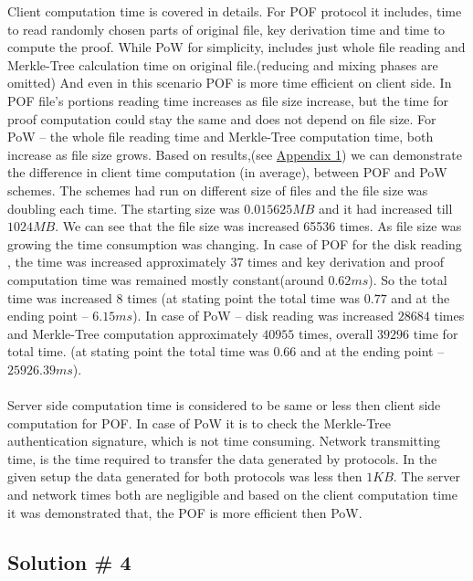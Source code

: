 \documentclass[12pt]{article}
\begin{document}
Client computation time is covered in details. For POF protocol it includes, time to read randomly chosen parts of original file, key derivation time and time to compute the proof. While PoW for simplicity, includes just whole file reading and Merkle-Tree calculation time on original file.(reducing and mixing phases are omitted) And even in this scenario POF is more time efficient on client side. In POF file's portions reading time increases as file size increase, but the time for proof computation could stay the same and does not depend on file size. For PoW -- the whole file reading time and Merkle-Tree computation time, both increase as file size grows. Based on results,(see \hyperref[Appendix 1] {Appendix 1})  we can demonstrate  the difference in client time computation (in average), between POF and PoW schemes. The schemes had run on different size of files and the file size was doubling each time. The starting size was $0.015625MB$ and it had increased till $1024MB$. We can see that the file size was increased 65536 times. As file size was growing the time consumption was changing. In case of POF  for the disk reading , the time was increased approximately $37$ times and key derivation and  proof computation time was remained mostly constant(around $0.62 ms$). So the total time was increased $8$ times (at stating point the total time was $0.77$ and at the ending point -- $6.15 ms$). In case of PoW -- disk reading was increased $28684$ times and Merkle-Tree computation approximately $40955$ times, overall $39296$ time for total time. (at stating point the total time was $0.66$ and at the ending point -- $25926.39 ms$). \\\\
Server side computation time is considered to be same or less then client side computation for POF. In case of PoW it is to check the Merkle-Tree authentication signature, which is not time consuming. Network transmitting time, is the time required to transfer the data generated by protocols. In the given setup the data generated for both protocols was less then $1KB$. The server and network times both are negligible and based on the client computation time it was demonstrated that, the POF is more efficient then PoW.

\subsection{Solution \# 4}
\label{sub:Soltuion4}
\end{document}
